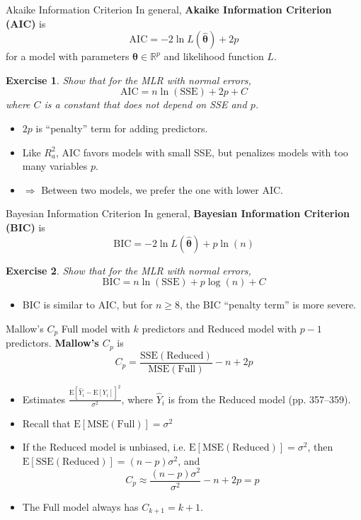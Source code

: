 \documentclass{beamer}
\newcommand{\E}{\mathrm{E}}
\newtheorem{exe}{Exercise}
\begin{document}
\begin{frame}{Akaike Information Criterion}
In general, \textbf{Akaike Information Criterion (AIC)} is
$$
\text{AIC}=-2\ln L(\hat{\boldsymbol\theta})+2p
$$
for a model with parameters $\boldsymbol\theta\in\mathbb{R}^p$ and likelihood function $L$.

\pause\begin{exe}
Show that for the MLR with normal errors,
$$
\text{AIC} = n\ln(\text{SSE})+2p + C
$$
where $C$ is a constant that does not depend on SSE and $p$.
\end{exe} 
\begin{itemize}
\item\pause $2p$ is ``penalty'' term for adding predictors.
\item\pause Like $R_a^2$, AIC favors models with small SSE, but penalizes models with too many variables $p$.
\item\pause $\Rightarrow$ Between two models, we prefer the one with lower AIC.
\end{itemize}
\end{frame}

\begin{frame}{Bayesian
Information Criterion}
In general, \textbf{Bayesian
Information Criterion (BIC)} is
$$
\text{BIC}=-2\ln L(\hat{\boldsymbol\theta})+p\ln(n)
$$
\pause\begin{exe}
Show that for the MLR with normal errors,
$$
\text{BIC} = n\ln(\text{SSE}) + p\log(n) + C
$$
\end{exe}
\pause\begin{itemize}
\item BIC is similar to AIC, but for $n\ge8$, the BIC ``penalty term'' is
more severe.
\end{itemize}
\end{frame}


\begin{frame}{Mallow's $C_p$}
Full model with $k$ predictors and Reduced model with $p - 1$ predictors. \pause \textbf{Mallow's $C_p$} is
$$
C_p=\frac{\text{SSE}(\text{Reduced})}{\text{MSE}(\text{Full})}-n+2p
$$
\begin{itemize}
\item\pause Estimates $\frac{\E[\hat{Y}_i-\E[Y_i]]^2}{\sigma^2}$, where $\hat{Y}_i$ is from the Reduced model (pp. 357--359).
\item\pause Recall that $\E[\text{MSE}(\text{Full})]=\sigma^2$
\item\pause If the Reduced model is unbiased, i.e. $\E[\text{MSE}(\text{Reduced})]=\sigma^2$, \pause then $\E[\text{SSE}(\text{Reduced})]=(n-p)\sigma^2$, \pause and
$$
C_p\approx\frac{(n-p)\sigma^2}{\sigma^2}-n+2p=p
$$
\item\pause The Full model always has $C_{k+1} = k + 1$.
\end{itemize}
\end{frame}
\end{document}
